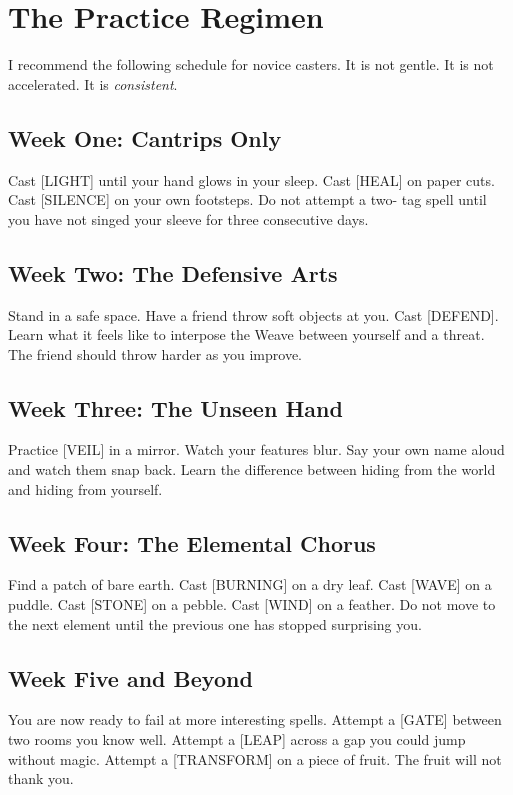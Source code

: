 \section{The Practice Regimen}

I recommend the following schedule for novice casters. It is not gentle. It is not accelerated. It is \emph{consistent}.

\subsection{Week One: Cantrips Only}

Cast [LIGHT] until your hand glows in your sleep. Cast [HEAL] on paper cuts. Cast [SILENCE] on your own footsteps. Do not attempt a two- tag spell until you have not singed your sleeve for three consecutive days.

\subsection{Week Two: The Defensive Arts}

Stand in a safe space. Have a friend throw soft objects at you. Cast [DEFEND]. Learn what it feels like to interpose the Weave between yourself and a threat. The friend should throw harder as you improve.

\subsection{Week Three: The Unseen Hand}

Practice [VEIL] in a mirror. Watch your features blur. Say your own name aloud and watch them snap back. Learn the difference between hiding from the world and hiding from yourself.

\subsection{Week Four: The Elemental Chorus}

Find a patch of bare earth. Cast [BURNING] on a dry leaf. Cast [WAVE] on a puddle. Cast [STONE] on a pebble. Cast [WIND] on a feather. Do not move to the next element until the previous one has stopped surprising you.

\subsection{Week Five and Beyond}

You are now ready to fail at more interesting spells. Attempt a [GATE] between two rooms you know well. Attempt a [LEAP] across a gap you could jump without magic. Attempt a [TRANSFORM] on a piece of fruit. The fruit will not thank you.

